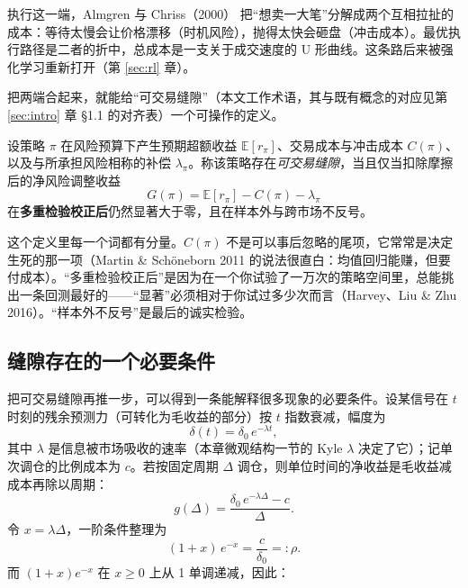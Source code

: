 执行这一端，Almgren 与 Chriss（2000）\cite{almgrenchriss2000} 把“想卖一大笔”分解成两个互相拉扯的成本：等待太慢会让价格漂移（时机风险），抛得太快会砸盘（冲击成本）。最优执行路径是二者的折中，总成本是一支关于成交速度的 U 形曲线。这条路后来被强化学习重新打开（第 \ref{sec:rl} 章）。

把两端合起来，就能给“可交易缝隙”（本文工作术语，其与既有概念的对应见第 \ref{sec:intro} 章 §1.1 的对齐表）一个可操作的定义。

\begin{definition}[可交易缝隙]
设策略 $\pi$ 在风险预算下产生预期超额收益 $\mathbb{E}[r_\pi]$、交易成本与冲击成本 $C(\pi)$、以及与所承担风险相称的补偿 $\lambda_\pi$。称该策略存在\emph{可交易缝隙}，当且仅当扣除摩擦后的净风险调整收益
\begin{equation}
  G(\pi) = \mathbb{E}[r_\pi] - C(\pi) - \lambda_\pi
\end{equation}
在\textbf{多重检验校正后}仍然显著大于零，且在样本外与跨市场不反号。
\end{definition}

这个定义里每一个词都有分量。$C(\pi)$ 不是可以事后忽略的尾项，它常常是决定生死的那一项（Martin \& Sch\"oneborn 2011 的说法很直白：均值回归能赚，但要付成本\cite{martin2011}）。“多重检验校正后”是因为在一个你试验了一万次的策略空间里，总能挑出一条回测最好的——“显著”必须相对于你试过多少次而言（Harvey、Liu \& Zhu 2016\cite{harveylz2016}）。“样本外不反号”是最后的诚实检验。

\subsection{缝隙存在的一个必要条件}\label{sec:gapcondition}

把可交易缝隙再推一步，可以得到一条能解释很多现象的必要条件。设某信号在 $t$ 时刻的残余预测力（可转化为毛收益的部分）按 $t$ 指数衰减，幅度为
\begin{equation}
  \delta(t) = \delta_0\, e^{-\lambda t},
\end{equation}
其中 $\lambda$ 是信息被市场吸收的速率（本章微观结构一节的 Kyle $\lambda$ 决定了它）；记单次调仓的比例成本为 $c$。若按固定周期 $\Delta$ 调仓，则单位时间的净收益是毛收益减成本再除以周期：
\begin{equation}
  g(\Delta) = \frac{\delta_0\, e^{-\lambda\Delta} - c}{\Delta}.
\end{equation}
令 $x=\lambda\Delta$，一阶条件整理为
\begin{equation}
  (1+x)\,e^{-x} = \frac{c}{\delta_0} =: \rho .
\end{equation}
而 $(1+x)e^{-x}$ 在 $x\ge 0$ 上从 1 单调递减，因此：

